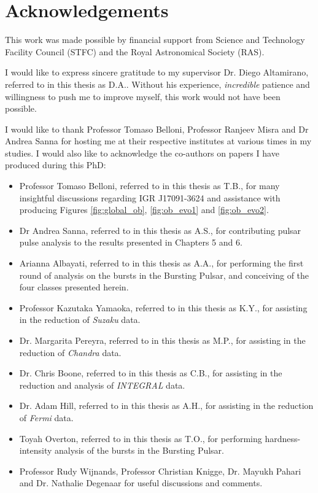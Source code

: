 \chapter*{Acknowledgements}


\par This work was made possible by financial support from Science and Technology Facility Council (STFC) and the Royal Astronomical Society (RAS).
\par I would like to express sincere gratitude to my supervisor Dr. Diego Altamirano, referred to in this thesis as \textsf{D.A.}.  Without his experience, \textit{incredible} patience and willingness to push me to improve myself, this work would not have been possible.
\par I would like to thank Professor Tomaso Belloni, Professor Ranjeev Misra and Dr Andrea Sanna for hosting me at their respective institutes at various times in my studies.  I would also like to acknowledge the co-authors on papers I have produced during this PhD:
\begin{itemize}
\item Professor Tomaso Belloni, referred to in this thesis as \textsf{T.B.}, for many insightful discussions regarding IGR J17091-3624 and assistance with producing Figures \ref{fig:global_ob}, \ref{fig:ob_evo1} and \ref{fig:ob_evo2}.
\item Dr Andrea Sanna, referred to in this thesis as \textsf{A.S.}, for contributing pulsar pulse analysis to the results presented in Chapters 5 and 6.
\item Arianna Albayati, referred to in this thesis as \textsf{A.A.}, for performing the first round of analysis on the bursts in the Bursting Pulsar, and conceiving of the four classes presented herein.
\item Professor Kazutaka Yamaoka, referred to in this thesis as \textsf{K.Y.}, for assisting in the reduction of \textit{Suzaku} data.
\item Dr. Margarita Pereyra, referred to in this thesis as \textsf{M.P.}, for assisting in the reduction of \textit{Chandra} data.
\item Dr. Chris Boone, referred to in this thesis as \textsf{C.B.}, for assisting in the reduction and analysis of \textit{INTEGRAL} data.
\item Dr. Adam Hill, referred to in this thesis as \textsf{A.H.}, for assisting in the reduction of \textit{Fermi} data.
\item Toyah Overton, referred to in this thesis as \textsf{T.O.}, for performing hardness-intensity analysis of the bursts in the Bursting Pulsar.
\item Professor Rudy Wijnands, Professor Christian Knigge, Dr. Mayukh Pahari and Dr. Nathalie Degenaar for useful discussions and comments.
\end{itemize}
